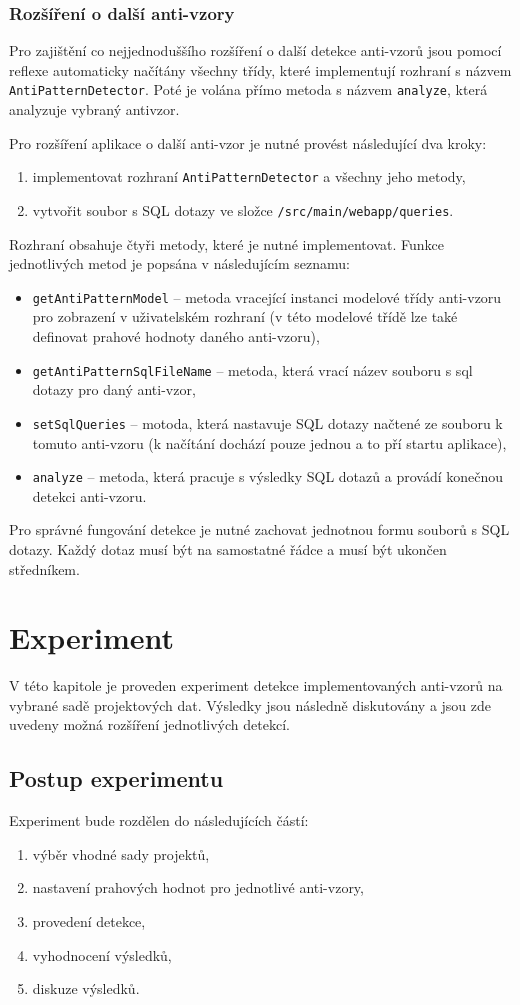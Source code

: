 \documentclass[czech,DP]{thesiskiv}
\begin{document}
\subsection{Rozšíření o další anti-vzory}
Pro zajištění co nejjednoduššího rozšíření o další detekce anti-vzorů jsou pomocí reflexe automaticky načítány všechny třídy, které implementují rozhraní s názvem \texttt{AntiPatternDetector}. Poté je volána přímo metoda s názvem \texttt{analyze}, která analyzuje vybraný antivzor.
\par
Pro rozšíření aplikace o další anti-vzor je nutné provést následující dva kroky:
\begin{enumerate}
    \item implementovat rozhraní \texttt{AntiPatternDetector} a všechny jeho metody,
    \item vytvořit soubor s SQL dotazy ve složce \texttt{/src/main/webapp/queries}.
\end{enumerate}
Rozhraní obsahuje čtyři metody, které je nutné implementovat. Funkce jednotlivých metod je popsána v následujícím seznamu:
\begin{itemize}
    \item \texttt{getAntiPatternModel} -- metoda vracející instanci modelové třídy anti-vzoru pro zobrazení v uživatelském rozhraní (v této modelové třídě lze také definovat prahové hodnoty daného anti-vzoru),
    \item \texttt{getAntiPatternSqlFileName} -- metoda, která vrací název souboru s sql dotazy pro daný anti-vzor,
    \item \texttt{setSqlQueries} -- motoda, která nastavuje SQL dotazy načtené ze souboru k tomuto anti-vzoru (k načítání dochází pouze jednou a to pří startu aplikace), 
    \item \texttt{analyze} -- metoda, která pracuje s výsledky SQL dotazů a provádí konečnou detekci anti-vzoru.
\end{itemize}
Pro správné fungování detekce je nutné zachovat jednotnou formu souborů s SQL dotazy. Každý dotaz musí být na samostatné řádce a musí být ukončen středníkem.
\chapter{Experiment}
V této kapitole je proveden experiment detekce implementovaných anti-vzorů na vybrané sadě projektových dat. Výsledky jsou následně diskutovány a jsou zde uvedeny možná rozšíření jednotlivých detekcí.
\section{Postup experimentu}
Experiment bude rozdělen do následujících částí:
\begin{enumerate}
    \item výběr vhodné sady projektů,
    \item nastavení prahových hodnot pro jednotlivé anti-vzory,
    \item provedení detekce,
    \item vyhodnocení výsledků,
    \item diskuze výsledků.
\end{enumerate}
\end{document}
